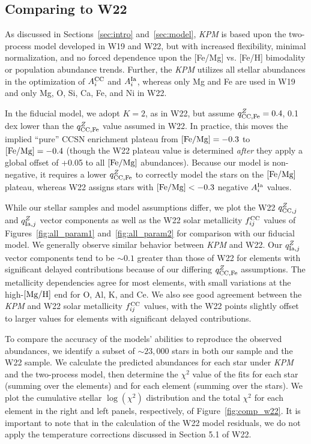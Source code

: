 \documentclass[modern, linenumbers]{aastex631}
\newcommand{\femg}{[{\rm Fe}/{\rm Mg}]}
\newcommand{\mgh}{[{\rm Mg}/{\rm H}]}
\newcommand{\qcc}{q_{{\rm CC,}j}^{Z}}
\newcommand{\qccFe}{q_{{\rm CC, Fe}}^{Z}}
\newcommand{\qIa}{q_{{\rm Ia,}j}^{Z}}
\newcommand{\Acc}{A^{\rm CC}_{i}}
\newcommand{\AIa}{A^{\rm Ia}_{i}}
\newcommand{\fcc}{f_{ij}^{\rm CC}}
\newcommand{\name}{\textsl{KPM}}
\begin{document}
\subsection{Comparing to W22}\label{subsec:w22}

As discussed in Sections~\ref{sec:intro} and~\ref{sec:model}, \name{} is based upon the two-process model developed in W19 and W22, but with increased flexibility, minimal normalization, and no forced dependence upon the [Fe/Mg] vs. [Fe/H] bimodality or population abundance trends. Further, the \name{} utilizes all stellar abundances in the optimization of $\Acc$ and $\AIa$, whereas only Mg and Fe are used in W19 and only Mg, O, Si, Ca, Fe, and Ni in W22. 

In the fiducial model, we adopt $K=2$, as in W22, but assume $\qccFe = 0.4$, 0.1 dex lower than the $\qccFe$ value assumed in W22. In practice, this moves the implied ``pure'' CCSN enrichment plateau from $\femg=-0.3$ to $\femg=-0.4$ (though the W22 plateau value is determined \textit{after} they apply a global offset of +0.05 to all $\femg$ abundances). Because our model is non-negative, it requires a lower $\qccFe$ to correctly model the stars on the $\femg$ plateau, whereas W22 assigns stars with $\femg < -0.3$ negative $\AIa$ values.

While our stellar samples and model assumptions differ, we plot the W22 $\qcc$ and $\qIa$ vector components as well as the W22 solar metallicity $\fcc$ values of Figures~\ref{fig:all_param1} and~\ref{fig:all_param2} for comparison with our fiducial model. We generally observe similar behavior between \name{} and W22. Our $\qIa$ vector components tend to be $\sim 0.1$ greater than those of W22 for elements with significant delayed contributions because of our differing $\qccFe$ assumptions. The metallicity dependencies agree for most elements, with small variations at the high-$\mgh$ end for O, Al, K, and Ce. We also see good agreement between the \name{} and W22 solar metallicity $\fcc$ values, with the W22 points slightly offset to larger values for elements with significant delayed contributions.

To compare the accuracy of the models' abilities to reproduce the observed abundances, we identify a subset of $\sim 23,000$ stars in both our sample and the W22 sample. We calculate the predicted abundances for each star under \name{} and the two-process model, then determine the $\chi^2$ value of the fits for each star (summing over the elements) and for each element (summing over the stars). We plot the cumulative stellar $\log(\chi^2)$ distribution and the total $\chi^2$ for each element in the right and left panels, respectively, of Figure~\ref{fig:comp_w22}. It is important to note that in the calculation of the W22 model residuals, we do not apply the temperature corrections discussed in Section 5.1 of W22. 
\end{document}
